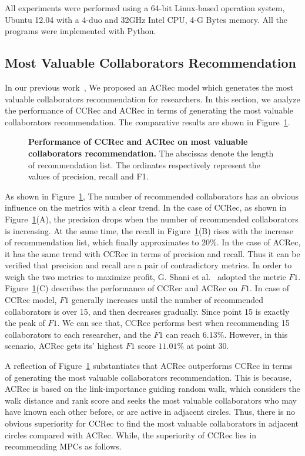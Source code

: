 \documentclass[10pt,letterpaper]{article}
\begin{document}
All experiments were performed using a 64-bit Linux-based operation system, Ubuntu 12.04 with a 4-duo and 32GHz Intel CPU, 4-G Bytes memory. All the programs were implemented with Python.

\subsection*{Most Valuable Collaborators Recommendation}
In our previous work~\cite{li2014acrec}, We proposed an ACRec model which generates the most valuable collaborators recommendation for researchers. In this section, we analyze the performance of CCRec and ACRec in terms of generating the most valuable collaborators recommendation. The comparative results are shown in Figure~\ref{Fig. 3}.

\begin{figure}[!hbt]
\caption{{\bf Performance of CCRec and ACRec on most valuable collaborators recommendation.} The abscissas denote the length of recommendation list. The ordinates respectively represent the values of precision, recall and F1.}
\label{Fig. 3}
\end{figure}

As shown in Figure~\ref{Fig. 3}, The number of recommended collaborators has an obvious influence on the metrics with a clear trend. In the case of CCRec, as shown in Figure~\ref{Fig. 3}(A), the precision drops when the number of recommended collaborators is increasing. At the same time, the recall in Figure~\ref{Fig. 3}(B) rises with the increase of recommendation list, which finally approximates to $20\%$. In the case of ACRec, it has the same trend with CCRec in terms of precision and recall. Thus it can be verified that precision and recall are a pair of contradictory metrics. In order to weigh the two metrics to maximize profit, G. Shani et al.~\cite{shani2011evaluating} adopted the metric $F1$. Figure~\ref{Fig. 3}(C) describes the performance of CCRec and ACRec on $F1$. In case of CCRec model, $F1$ generally increases until the number of recommended collaborators is over 15, and then decreases gradually. Since point 15 is exactly the peak of $F1$. We can see that, CCRec performs best when recommending 15 collaborators to each researcher, and the $F1$ can reach $6.13\%$. However, in this scenario, ACRec gets its' highest $F1$ score $11.01\%$ at point 30.

A reflection of Figure~\ref{Fig. 3} substantiates that ACRec outperforms CCRec in terms of generating the most valuable collaborators recommendation. This is because, ACRec is based on the link-importance guiding random walk, which considers the walk distance and rank score and seeks the most valuable collaborators who may have known each other before, or are active in adjacent circles. Thus, there is no obvious superiority for CCRec to find the most valuable collaborators in adjacent circles compared with ACRec. While, the superiority of CCRec lies in recommending MPCs as follows.
\end{document}
